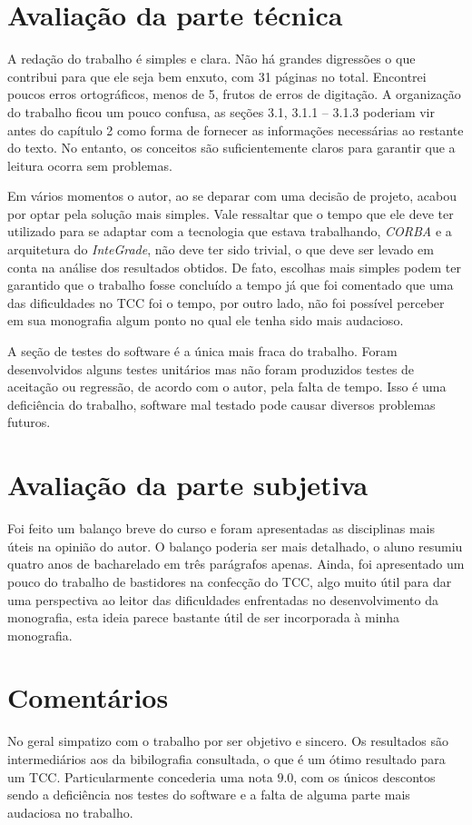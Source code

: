 \documentclass{article}
\begin{document}
\section{Avaliação da parte técnica}
	A redação do trabalho é simples e clara. Não há grandes digressões o que contribui para que ele seja bem enxuto, com 31 páginas no total. Encontrei poucos erros ortográficos, menos de 5, frutos de erros de digitação. A organização do trabalho ficou um pouco confusa, as seções 3.1, 3.1.1 -- 3.1.3 poderiam vir antes do capítulo 2 como forma de fornecer as informações necessárias ao restante do texto. No entanto, os conceitos são suficientemente claros para garantir que a leitura ocorra sem problemas.

	Em vários momentos o autor, ao se deparar com uma decisão de projeto, acabou por optar pela solução mais simples. Vale ressaltar que o tempo que ele deve ter utilizado para se adaptar com a tecnologia que estava trabalhando, \emph{CORBA} e a arquitetura do \emph{InteGrade}, não deve ter sido trivial, o que deve ser levado em conta na análise dos resultados obtidos. De fato, escolhas mais simples podem ter garantido que o trabalho fosse concluído a tempo já que foi comentado que uma das dificuldades no TCC foi o tempo, por outro lado, não foi possível perceber em sua monografia algum ponto no qual ele tenha sido mais audacioso. 
	
	A seção de testes do software é a única mais fraca do trabalho. Foram desenvolvidos alguns testes unitários mas não foram produzidos testes de aceitação ou regressão, de acordo com o autor, pela falta de tempo. Isso é uma deficiência do trabalho, software mal testado pode causar diversos problemas futuros.
	
\section{Avaliação da parte subjetiva}
	Foi feito um balanço breve do curso e foram apresentadas as disciplinas mais úteis na opinião do autor. O balanço poderia ser mais detalhado, o aluno resumiu quatro anos de bacharelado em três parágrafos apenas. Ainda, foi apresentado um pouco do trabalho de bastidores na confecção do TCC, algo muito útil para dar uma perspectiva ao leitor das dificuldades enfrentadas no desenvolvimento da monografia, esta ideia parece bastante útil de ser incorporada à minha monografia. 
	
\section{Comentários}
	No geral simpatizo com o trabalho por ser objetivo e sincero. Os resultados são intermediários aos da bibilografia consultada, o que é um ótimo resultado para um TCC. Particularmente concederia uma nota $9.0$, com os únicos descontos sendo a deficiência nos testes do software e a falta de alguma parte mais audaciosa no trabalho.


%
%
\end{document}
